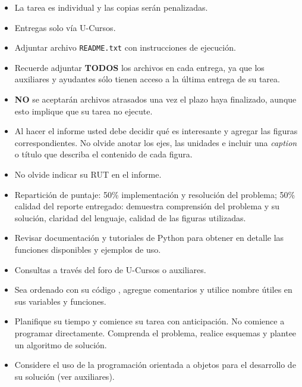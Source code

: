 \documentclass[letterpaper,11pt]{article} %
\begin{document}
\begin{itemize}
	\item La tarea es individual y las copias ser\'an penalizadas.
	\item Entregas solo vía U-Cursos.
	\item Adjuntar archivo \texttt{README.txt} con instrucciones de ejecución.
	\item Recuerde adjuntar \textbf{TODOS} los archivos en cada entrega, ya que los auxiliares y ayudantes sólo tienen acceso a la \'ultima entrega de su tarea.
	\item \textbf{NO} se aceptarán archivos atrasados una vez el plazo haya finalizado, aunque esto implique que su tarea no ejecute.
	\item Al hacer el informe usted debe decidir qué es interesante y
	agregar las figuras correspondientes. No olvide anotar los ejes, las unidades e incluir una \emph{caption} o título que describa el contenido de cada figura.
	
	\item No olvide indicar su RUT en el informe.
	
	\item Repartición de puntaje: 50\% implementación y resolución del problema; 50\% calidad del reporte entregado: demuestra comprensión del problema y su solución, claridad del lenguaje, calidad de las figuras utilizadas.
	\end {itemize}
	

\begin{itemize}
	\normalsize\item Revisar documentaci\'on y tutoriales de Python para obtener en detalle las funciones disponibles y ejemplos de uso.
	\normalsize\item Consultas a trav\'es del foro de U-Cursos o auxiliares.
	\normalsize\item Sea ordenado con su c\'odigo , agregue comentarios y utilice nombre \'utiles en sus variables y funciones.
	\normalsize\item Planifique su tiempo y comience su tarea con anticipaci\'on. No comience a programar directamente. Comprenda el problema, realice esquemas y plantee un algoritmo de soluci\'on.
	\normalsize\item Considere el uso de la programación orientada a objetos para el desarrollo de su solución (ver auxiliares).
\end{itemize}

\end{document}
